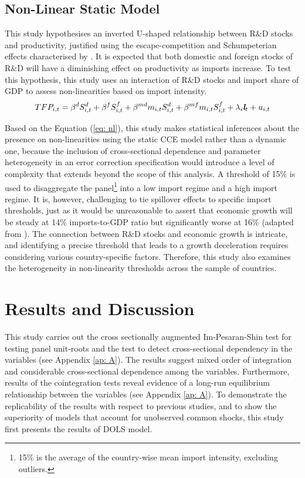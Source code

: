 \documentclass[12pt]{article}
\begin{document}
\subsection{Non-Linear Static Model}

This study hypothesises an inverted U-shaped relationship between R\&D stocks and productivity, justified using the escape-competition and Schumpeterian effects characterised by \citet{Aghion2005}. It is expected that both domestic and foreign stocks of R\&D will have a diminishing effect on productivity as imports increase. To test this hypothesis, this study uses an interaction of R\&D stocks and import share of GDP to assess non-linearities based on import intensity.
\begin{equation}
TFP_{i,t}=\beta^d S_{i,t}^{d} + \beta^f S_{i,t}^{f} + \beta^{md} m_{i,t} S_{i,t}^{d} +  \beta^{mf} m_{i,t} S_{i,t}^{f} + \lambda_i \textit{\textbf{l}}_t + u_{i,t}
\label{eq: nl}
\end{equation}

Based on the Equation (\ref{eq: nl}), this study makes statistical inferences about the presence on non-linearities using the static CCE model rather than a dynamic one, because the inclusion of cross-sectional dependence and parameter heterogeneity in an error correction specification would introduce a level of complexity that extends beyond the scope of this analysis. A threshold of 15\% is used to disaggregate the panel\footnote{15\% is the average of the country-wise mean import intensity, excluding outliers.} into a low import regime and a high import regime. It is, however, challenging to tie spillover effects to specific import thresholds, just as it would be unreasonable to assert that economic growth will be steady at 14\% imports-to-GDP ratio but significantly worse at 16\% (adapted from \citet{Eberhardt2015}). The connection between R\&D stocks and economic growth is intricate, and identifying a precise threshold that leads to a growth deceleration requires considering various country-specific factors. Therefore, this study also examines the heterogeneity in non-linearity thresholds across the sample of countries.


\section{Results and Discussion}

This study carries out the cross sectionally augmented Im-Pesaran-Shin \citep{Pesaran2007} test for testing panel unit-roots and the \citet{Pesaran2004} test to detect cross-sectional dependency in the variables (see Appendix \ref{ap: A}). The results suggest mixed order of integration and considerable cross-sectional dependence among the variables. Furthermore, results of the \citet{Westerlund2007} cointegration tests reveal evidence of a long-run equilibrium relationship between the variables (see Appendix \ref{ap: A}). To demonstrate the replicability of the results with respect to previous studies, and to show the superiority of models that account for unobserved common shocks, this study first presents the results of DOLS model.
\end{document}
